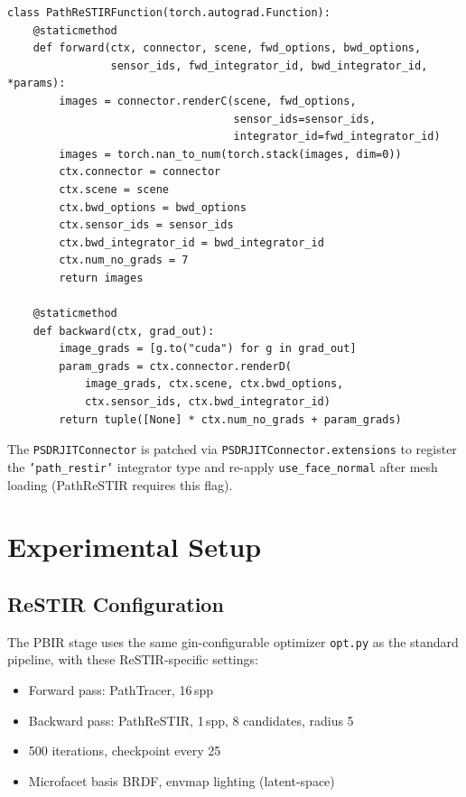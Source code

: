 \begin{lstlisting}[caption={PathReSTIRRenderer --- \texttt{torch.autograd.Function} wrapping PathTracer forward and PathReSTIR backward.},label={lst:renderer},float,floatplacement=t]
class PathReSTIRFunction(torch.autograd.Function):
    @staticmethod
    def forward(ctx, connector, scene, fwd_options, bwd_options,
                sensor_ids, fwd_integrator_id, bwd_integrator_id, *params):
        images = connector.renderC(scene, fwd_options,
                                   sensor_ids=sensor_ids,
                                   integrator_id=fwd_integrator_id)
        images = torch.nan_to_num(torch.stack(images, dim=0))
        ctx.connector = connector
        ctx.scene = scene
        ctx.bwd_options = bwd_options
        ctx.sensor_ids = sensor_ids
        ctx.bwd_integrator_id = bwd_integrator_id
        ctx.num_no_grads = 7
        return images

    @staticmethod
    def backward(ctx, grad_out):
        image_grads = [g.to("cuda") for g in grad_out]
        param_grads = ctx.connector.renderD(
            image_grads, ctx.scene, ctx.bwd_options,
            ctx.sensor_ids, ctx.bwd_integrator_id)
        return tuple([None] * ctx.num_no_grads + param_grads)
\end{lstlisting}

The \texttt{PSDRJITConnector} is patched via
\texttt{PSDRJITConnector.extensions} to register the \texttt{'path\_restir'}
integrator type and re-apply \texttt{use\_face\_normal} after mesh loading
(PathReSTIR requires this flag).

\section{Experimental Setup}

\subsection{ReSTIR Configuration}

The PBIR stage uses the same gin-configurable optimizer \texttt{opt.py} as the
standard pipeline, with these ReSTIR-specific settings:

\begin{itemize}
    \item Forward pass: PathTracer, 16\,spp
    \item Backward pass: PathReSTIR, 1\,spp, 8 candidates, radius 5
    \item 500 iterations, checkpoint every 25
    \item Microfacet basis BRDF, envmap lighting (latent-space)
\end{itemize}

